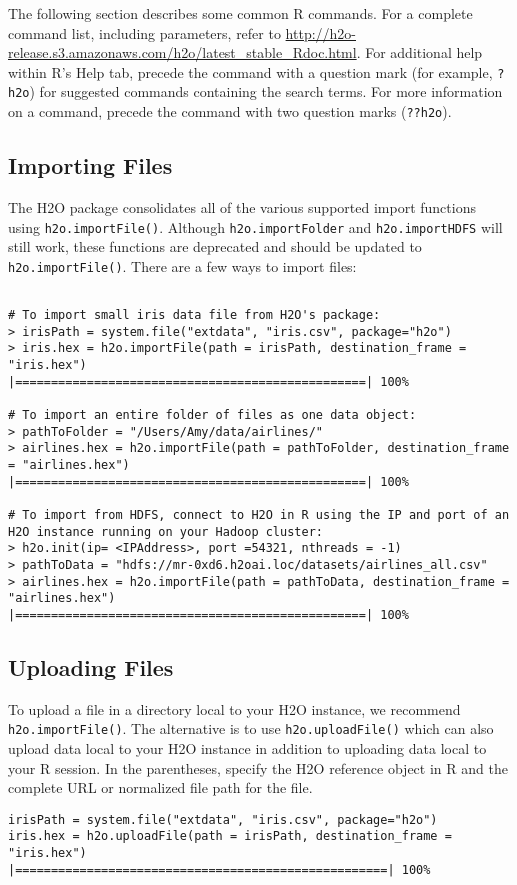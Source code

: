 The following section describes some common R commands. For a complete command list, including parameters, refer to {\url{http://h2o-release.s3.amazonaws.com/h2o/latest_stable_Rdoc.html}}.
For additional help within R's Help tab, precede the command with a question mark (for example, {\texttt{?h2o}}) for suggested commands containing the search terms. For more information on a command, precede the command with two question marks ({\texttt{??h2o}}). 

\subsection{Importing Files}

The H2O package consolidates all of the various supported import functions using {\texttt{h2o.importFile()}}. Although {\texttt{h2o.importFolder}} and {\texttt{h2o.importHDFS}} will still work, these functions are deprecated and should be updated to {\texttt{h2o.importFile()}}. There are a few ways to import files: 

\begin{lstlisting}[style=R]

# To import small iris data file from H2O's package:
> irisPath = system.file("extdata", "iris.csv", package="h2o")
> iris.hex = h2o.importFile(path = irisPath, destination_frame = "iris.hex")
|=================================================| 100%

# To import an entire folder of files as one data object:
> pathToFolder = "/Users/Amy/data/airlines/"
> airlines.hex = h2o.importFile(path = pathToFolder, destination_frame = "airlines.hex")
|=================================================| 100%

# To import from HDFS, connect to H2O in R using the IP and port of an H2O instance running on your Hadoop cluster:
> h2o.init(ip= <IPAddress>, port =54321, nthreads = -1)
> pathToData = "hdfs://mr-0xd6.h2oai.loc/datasets/airlines_all.csv"
> airlines.hex = h2o.importFile(path = pathToData, destination_frame = "airlines.hex")
|=================================================| 100%
\end{lstlisting}


\subsection{Uploading Files}

To upload a file in a directory local to your H2O instance, we recommend {\texttt{h2o.importFile()}}. The alternative is to use {\texttt{h2o.uploadFile()}} which can also upload data local to your H2O instance in addition to uploading data local to your R session. In the parentheses, specify the H2O reference object in R and the complete URL or normalized file path for the file.
\begin{lstlisting}[style=R]
irisPath = system.file("extdata", "iris.csv", package="h2o")
iris.hex = h2o.uploadFile(path = irisPath, destination_frame = "iris.hex")
|====================================================| 100% 
\end{lstlisting}


